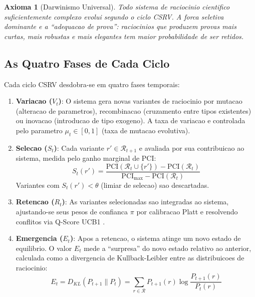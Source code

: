 \documentclass[5p]{elsarticle}
\newtheorem{axiom}[theorem]{Axioma}
\begin{document}
\begin{axiom}[Darwinismo Universal]
  Todo sistema de raciocinio cientifico suficientemente complexo evolui
  segundo o ciclo CSRV. A forca seletiva dominante e a ``adequacao de prova'':
  raciocinios que produzem provas mais curtas, mais robustas e mais elegantes
  tem maior probabilidade de ser retidos.
\end{axiom}

\subsection{As Quatro Fases de Cada Ciclo}

Cada ciclo CSRV desdobra-se em quatro fases temporais:

\begin{enumerate}[label=Fase \arabic*:]
  \item \textbf{Variacao ($V_t$)}: O sistema gera novas variantes de raciocinio
    por mutacao (alteracao de parametros), recombinacao (cruzamento entre
    tipos existentes) ou inovacao (introducao de tipo exogeno). A taxa de
    variacao e controlada pelo parametro $\mu_t \in [0,1]$ (taxa de mutacao
    evolutiva).

  \item \textbf{Selecao ($S_t$)}: Cada variante $r' \in \mathcal{R}_{t+1}$ e
    avaliada por sua contribuicao ao sistema, medida pelo ganho marginal de
    PCI:
    \begin{equation}
      S_t(r') = \frac{\text{PCI}(\mathcal{R}_t \cup \{r'\}) - \text{PCI}(\mathcal{R}_t)}
                     {\text{PCI}_{\max} - \text{PCI}(\mathcal{R}_t)}
    \end{equation}
    Variantes com $S_t(r') < \theta$ (limiar de selecao) sao descartadas.

  \item \textbf{Retencao ($R_t$)}: As variantes selecionadas sao integradas ao
    sistema, ajustando-se seus pesos de confianca $\pi$ por calibracao
    Platt \cite{platt1999,guo2017} e resolvendo conflitos via Q-Score
    UCB1 \cite{auer2002}.

  \item \textbf{Emergencia ($E_t$)}: Apos a retencao, o sistema atinge um novo
    estado de equilibrio. O valor $E_t$ mede a ``surpresa'' do novo estado
    relativo ao anterior, calculada como a divergencia de Kullback-Leibler
    entre as distribuicoes de raciocinio:
    \begin{equation}
      E_t = D_{KL}(P_{t+1} \| P_t) = \sum_{r \in \mathcal{R}} P_{t+1}(r) \log \frac{P_{t+1}(r)}{P_t(r)}
    \end{equation}
\end{enumerate}
\end{document}
